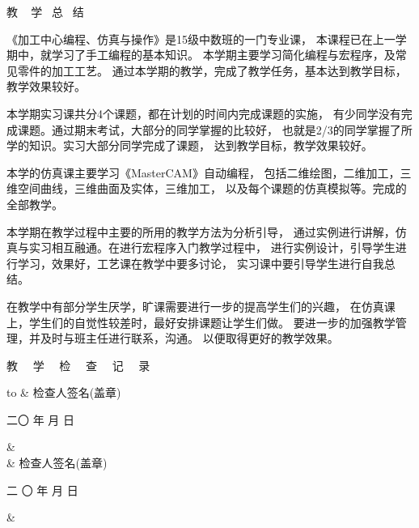 \documentclass[UTF8,zihao = -4]{ctexart}
\begin{document}
\newpage
{}
\renewcommand{\baselinestretch}{1.3}
{
\begin{center}
	\huge \heiti 教 ~ 学  ~总  ~结
\end{center}

 \large  \setlength{\parindent}{2em} 
 
《加工中心编程、仿真与操作》是15级中数班的一门专业课，
 本课程已在上一学期中，就学习了手工编程的基本知识。
 本学期主要学习简化编程与宏程序，及常见零件的加工工艺。
 通过本学期的教学，完成了教学任务，基本达到教学目标，教学效果较好。

本学期实习课共分4个课题，都在计划的时间内完成课题的实施，
有少同学没有完成课题。通过期末考试，大部分的同学掌握的比较好，
也就是2/3的同学掌握了所学的知识。实习大部分同学完成了课题，
达到教学目标，教学效果较好。

本学的仿真课主要学习《MasterCAM》自动编程，
包括二维绘图，二维加工，三维空间曲线，三维曲面及实体，三维加工，
以及每个课题的仿真模拟等。完成的全部教学。

本学期在教学过程中主要的所用的教学方法为分析引导，
通过实例进行讲解，仿真与实习相互融通。在进行宏程序入门教学过程中，
进行实例设计，引导学生进行学习，效果好，工艺课在教学中要多讨论，
实习课中要引导学生进行自我总结。

在教学中有部分学生厌学，旷课需要进行一步的提高学生们的兴趣，
在仿真课上，学生们的自觉性较差时，最好安排课题让学生们做。
要进一步的加强教学管理，并及时与班主任进行联系，沟通。
以便取得更好的教学效果。

\newpage
{}
\pagestyle{empty}
\begin{center}
	\huge \heiti 教 ~~学 ~~检 ~~查 ~~记~~ 录
	
	\songti\normalsize 
	\begin{tabu} to \textwidth {|X[1,c,m]|X[10,r,m]|N}
		\hline
	  &\vspace{7cm}  检查人签名(盖章) 
	\hspace{4cm} \par  二〇 \underline{\hspace{2em}}   
	年\underline{\hspace{1em}}   月 \underline{\hspace{1em}}  日 
	\hspace{1cm}  \par &\\ [7.5cm] \hline
	 & \vspace{7cm}  检查人签名(盖章) 
	\hspace{4cm} \par  二 〇  \underline{\hspace{2em}} 年  
	\underline{\hspace{1em}} 月 \underline{\hspace{1em}}  日 \hspace{1cm} 
	\par & \\[7.cm] \hline	
	\end{tabu}
\end{center}




}
\end{document}
